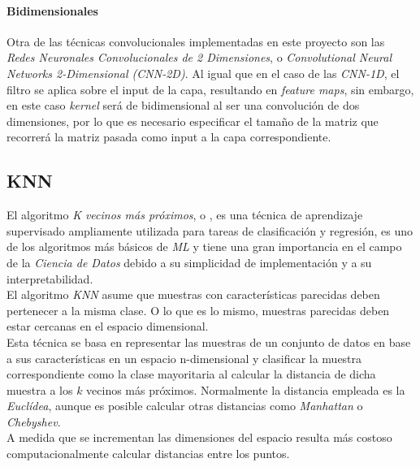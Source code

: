                     
                \paragraph{Bidimensionales}
                    Otra de las técnicas convolucionales implementadas en este proyecto son las \textit{Redes Neuronales Convolucionales de 2 Dimensiones}, o \textit{Convolutional Neural Networks 2-Dimensional (CNN-2D)}. Al igual que en el caso de las \textit{CNN-1D}, el filtro se aplica sobre el input de la capa, resultando en \textit{feature maps}, sin embargo, en este caso \textit{kernel} será de bidimensional al ser una convolución de dos dimensiones, por lo que es necesario especificar el tamaño de la matriz que recorrerá la matriz pasada como input a la capa correspondiente.

            \subsection {KNN}

                El algoritmo \textit{K vecinos más próximos}, o  \cite{KNN}, es una técnica de aprendizaje supervisado ampliamente utilizada para tareas de clasificación y regresión, es uno de los algoritmos más básicos de \textit{ML} y tiene una gran importancia en el campo de la \textit{Ciencia de Datos} debido a su simplicidad de implementación y a su interpretabilidad.\\

                El algoritmo \textit{KNN} asume que muestras con características parecidas deben pertenecer a la misma clase. O lo que es lo mismo, muestras parecidas deben estar cercanas en el espacio dimensional.\\

                Esta técnica se basa en representar las muestras de un conjunto de datos en base a sus características en un espacio n-dimensional y clasificar la muestra correspondiente como la clase mayoritaria al calcular la distancia de dicha muestra a los $k$ vecinos más próximos. Normalmente la distancia empleada es la \textit{Euclídea}, aunque es posible calcular otras distancias como \textit{Manhattan} o \textit{Chebyshev}.\\
                
                A medida que se incrementan las dimensiones del espacio resulta más costoso computacionalmente calcular distancias entre los puntos.\\


